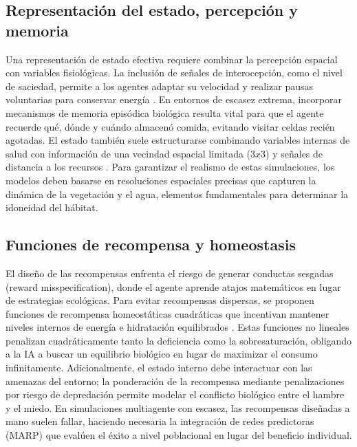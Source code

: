 \documentclass[conference]{IEEEtran}
\begin{document}
\subsection{Representación del estado, percepción y memoria}
Una representación de estado efectiva requiere combinar la percepción espacial 
con variables fisiológicas. La inclusión de señales de interocepción, como 
el nivel de saciedad, permite a los agentes adaptar su velocidad y realizar 
pausas voluntarias para conservar energía \cite{Paper1}. En entornos de 
escasez extrema, incorporar mecanismos de memoria episódica biológica resulta 
vital para que el agente recuerde qué, dónde y cuándo almacenó comida, 
evitando visitar celdas recién agotadas. El estado también suele estructurarse 
combinando variables internas de salud con información de una vecindad espacial
limitada ($3 x 3$) y señales de distancia a los recursos \cite{Paper2}. 
Para garantizar el realismo de estas simulaciones, los modelos deben basarse 
en resoluciones espaciales precisas que capturen la dinámica de la vegetación 
y el agua, elementos fundamentales para determinar la idoneidad del hábitat.

\subsection{Funciones de recompensa y homeostasis}
El diseño de las recompensas enfrenta el riesgo de generar conductas sesgadas 
(reward misspecification), donde el agente aprende atajos matemáticos en lugar 
de estrategias ecológicas. Para evitar recompensas dispersas, se proponen 
funciones de recompensa homeostáticas cuadráticas que incentivan mantener 
niveles internos de energía e hidratación equilibrados \cite{Paper2}. Estas 
funciones no lineales penalizan cuadráticamente tanto la deficiencia como la 
sobresaturación, obligando a la IA a buscar un equilibrio biológico en lugar 
de maximizar el consumo infinitamente. Adicionalmente, el estado interno debe 
interactuar con las amenazas del entorno; la ponderación de la recompensa 
mediante penalizaciones por riesgo de depredación permite modelar el conflicto 
biológico entre el hambre y el miedo. En simulaciones multiagente con escasez, 
las recompensas diseñadas a mano suelen fallar, haciendo necesaria la 
integración de redes predictoras (MARP) que evalúen el éxito a nivel 
poblacional en lugar del beneficio individual.
\end{document}
